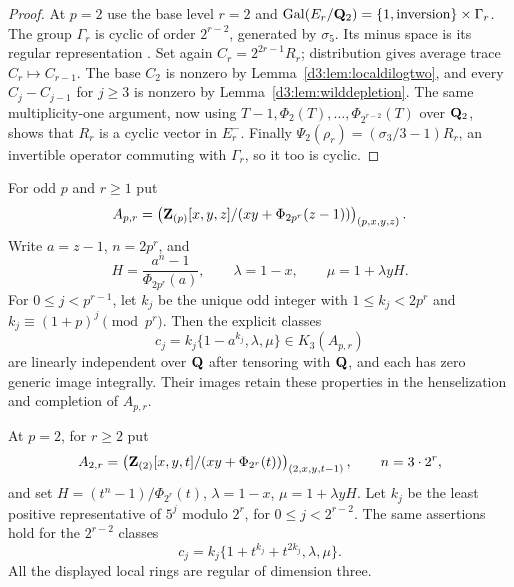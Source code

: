 \begin{proof}
At $p=2$ use the base level $r=2$ and
$\operatorname{Gal}(E_r/\mathbf Q_2)=\{1,\text{inversion}\}\times\Gamma_r$.
The group $\Gamma_r$ is cyclic of order $2^{r-2}$, generated by
$\sigma_5$. Its minus space is its regular representation
\cite[Chapter~I, p.~34]{MilneDuality}.
Set again $C_r=2^{2r-1}R_r$; distribution gives average trace
$C_r\mapsto C_{r-1}$. The base $C_2$ is nonzero by
Lemma~\ref{d3:lem:localdilogtwo}, and every
$C_j-C_{j-1}$ for $j\geq3$ is nonzero by
Lemma~\ref{d3:lem:wilddepletion}.
The same multiplicity-one argument, now using
$T-1,\Phi_2(T),\ldots,\Phi_{2^{r-2}}(T)$ over $\mathbf Q_2$,
shows that $R_r$ is a cyclic vector in $E_r^-$.
Finally $\Psi_2(\rho_r)=(\sigma_3/3-1)R_r$, an invertible
operator commuting with $\Gamma_r$, so it too is cyclic.
\end{proof}

\begin{theorem}
\label{d3:thm:explicitwildtriples}
For odd $p$ and $r\geq1$ put
\[
 A_{p,r}=\left(\mathbf Z_{(p)}[x,y,z]/
       (xy+\Phi_{2p^r}(z-1))\right)_{(p,x,y,z)}.
\]
Write $a=z-1$, $n=2p^r$, and
\[
 H=\frac{a^n-1}{\Phi_{2p^r}(a)},\qquad
 \lambda=1-x,\qquad \mu=1+\lambda yH.
\]
For $0\leq j<p^{r-1}$, let $k_j$ be the unique odd integer with $1\leq k_j<2p^r$ and
$k_j\equiv(1+p)^j\pmod{p^r}$.
Then the explicit classes
\[
 c_j=k_j\{1-a^{k_j},\lambda,\mu\}\in K_3(A_{p,r})
\]
are linearly independent over $\mathbf Q$ after tensoring with $\mathbf Q$,
and each has zero generic image integrally.
Their images retain these properties in the henselization and
completion of $A_{p,r}$.

At $p=2$, for $r\geq2$ put
\[
 A_{2,r}=\left(\mathbf Z_{(2)}[x,y,t]/
                 (xy+\Phi_{2^r}(t))\right)_{(2,x,y,t-1)},
 \qquad n=3\cdot2^r,
\]
and set $H=(t^n-1)/\Phi_{2^r}(t)$,
$\lambda=1-x$, $\mu=1+\lambda yH$.
Let $k_j$ be the least positive representative of $5^j$ modulo
$2^r$, for $0\leq j<2^{r-2}$.
The same assertions hold for the $2^{r-2}$ classes
\[
 c_j=k_j\{1+t^{k_j}+t^{2k_j},\lambda,\mu\}.
\]
All the displayed local rings are regular of dimension three.
\end{theorem}
